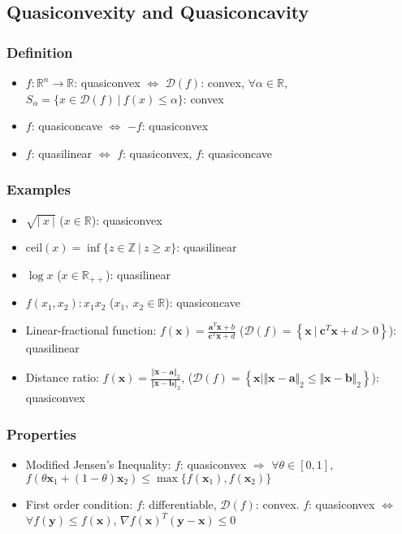 \subsection{Quasiconvexity and Quasiconcavity}

\subsubsection*{Definition}
\begin{itemize}
    \item $f:\mathbb{R}^n \rightarrow \mathbb{R}$: quasiconvex $\Leftrightarrow$ $\mathcal{D}(f)$: convex,
        $\forall \alpha \in \mathbb{R}$, $S_{\alpha} = \{x \in \mathcal{D}(f)~|~f(x)\leq\alpha\}$: convex
    \item $f$: quasiconcave $\Leftrightarrow$ $-f$: quasiconvex
    \item $f$: quasilinear $\Leftrightarrow$ $f$: quasiconvex, $f$: quasiconcave
\end{itemize}

\subsubsection*{Examples}
\begin{itemize}
    \item $\sqrt{|~x~|}$ ($x \in \mathbb{R}$): quasiconvex
    \item $\mathrm{ceil}(x) = \inf \{z \in \mathbb{Z}~|~z \geq x \}$: quasilinear
    \item $\log x$ ($x \in \mathbb{R}_{++}$): quasilinear
    \item $f(x_1, x_2): x_1 x_2$ ($x_1,~x_2 \in \mathbb{R}$): quasiconcave
    \item Linear-fractional function: $f(\mathbf{x}) = \frac {\mathbf{a}^T\mathbf{x} + b} {\mathbf{c}^T\mathbf{x} + d}$
        ($\mathcal{D}(f) = \left\{\mathbf{x}~|~\mathbf{c}^T\mathbf{x} + d > 0 \right\}$): quasilinear
    \item Distance ratio: $f(\mathbf{x}) = \frac {\Vert \mathbf{x} - \mathbf{a} \Vert_2} {\Vert \mathbf{x} - \mathbf{b} \Vert_2}$,
    ($\mathcal{D}(f) = \left\{\mathbf{x}|\Vert\mathbf{x}-\mathbf{a}\Vert_2 \leq \Vert\mathbf{x}-\mathbf{b}\Vert_2 \right\}$): quasiconvex
\end{itemize}

\subsubsection*{Properties}
\begin{itemize}
    \item Modified Jensen's Inequality: $f$: quasiconvex $\Rightarrow$ $\forall \theta \in [0,1]$,
        $f(\theta\mathbf{x}_1 + (1 - \theta)\mathbf{x}_2) \leq \max\{f(\mathbf{x}_1), f(\mathbf{x}_2)\}$
    \item First order condition: $f$: differentiable, $\mathcal{D}(f)$: convex. $f$: quasiconvex
        $\Leftrightarrow$ $\forall f(\mathbf{y}) \leq f(\mathbf{x})$,
        $\nabla f(\mathbf{x})^T (\mathbf{y} - \mathbf{x}) \leq 0 $
\end{itemize}

